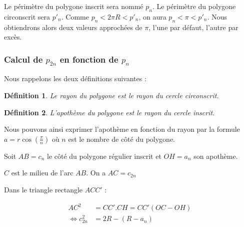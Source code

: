 \documentclass[11pt]{book}
\newtheorem{definition}{Définition}
\begin{document}
Le périmètre du polygone inscrit sera nommé $p_n$. Le périmètre du polygone circonscrit
sera $p'_n$. Comme $p_n < 2\pi R < p'_n$, on aura $p_n < \pi < p'_n$.
Nous obtiendrons alors deux valeurs approchées de $\pi$, l'une par défaut, l'autre par excès.

\subsubsection{Calcul de $p_{2n}$ en fonction de $p_n$}

Nous rappelons les deux définitions suivantes :
\begin{definition}
	Le rayon du polygone est le rayon du cercle circonscrit. 
\end{definition}

\begin{definition}
	L'apothème du polygone est le rayon du cercle inscrit. 
\end{definition}
Nous pouvons ainsi exprimer l'apothème en fonction du rayon par la formule $a = r \cos (\frac{\pi}{n}) $ où
$n$ est le nombre de côté du polygone.


Soit $AB = c_n$ le côté du polygone régulier inscrit et $OH=a_n$ son apothème. 

$C$ est le milieu de l'arc $AB$. On a $AC=c_{2n}$ 


\begin{figure}[H]
	\centering
	\end{figure}

Dans le triangle rectangle $ACC'$ : 

\begin{align*}
AC^2 &= CC'.CH = CC' (OC - OH) \\
\Leftrightarrow  c_{2n}^2 &= 2R -(R-a_n)
\end{align*}
\end{document}
